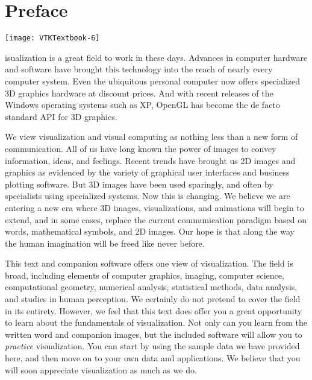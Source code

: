 
\chapter*{Preface}
\markright{}

\vspace{-7\baselineskip} %
\hfill
 \begin{minipage}{0.5\textwidth}
 \centering
 \texttt{[image: VTKTextbook-6]}
 \end{minipage}
\vspace{2\baselineskip}


isualization is a great field to work in these days. Advances in computer hardware and software have brought this technology into the reach of nearly every computer system. Even the ubiquitous personal computer now offers specialized 3D graphics hardware at discount prices. And with recent releases of the Windows operating systems such as XP, OpenGL has become the de facto standard \gls{API} for 3D graphics.

 We view visualization and visual computing as nothing less than a new form of communication. All of us have long known the power of images to convey information, ideas, and feelings. Recent trends have brought us 2D images and graphics as evidenced by the variety of graphical user interfaces and business plotting software. But 3D images have been used sparingly, and often by specialists using specialized systems. Now this is changing. We believe we are entering a new era where 3D images, visualizations, and animations will begin to extend, and in some cases, replace the current communication paradigm based on words, mathematical symbols, and 2D images. Our hope is that along the way the human imagination will be freed like never before.

This text and companion software offers one view of visualization. The field is broad, including elements of computer graphics, imaging, computer science, computational geometry, numerical analysis, statistical methods, data analysis, and studies in human perception. We certainly do not pretend to cover the field in its entirety. However, we feel that this text does offer you a great opportunity to learn about the fundamentals of visualization. Not only can you learn from the written word and companion images, but the included software will allow you to \textit{practice} visualization. You can start by using the sample data we have provided here, and then move on to your own data and applications. We believe that you will soon appreciate visualization as much as we do.

